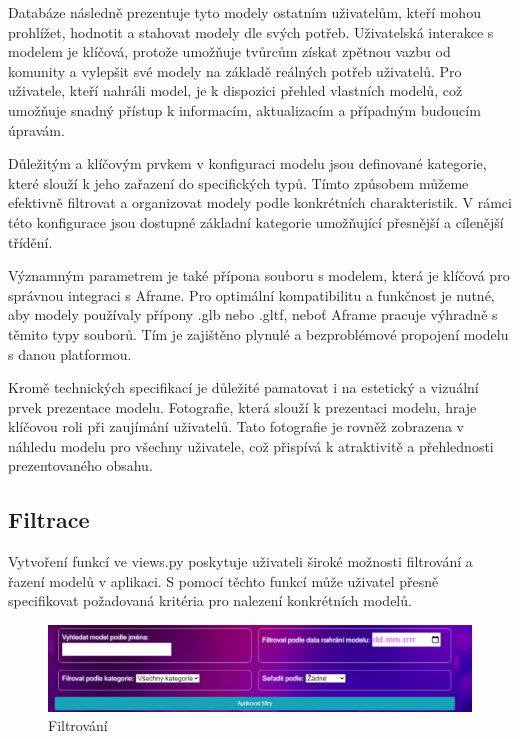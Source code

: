 \documentclass[12pt, a4paper,
oneside,      %
openright
]{report}
\begin{document}
	Databáze následně prezentuje tyto modely ostatním uživatelům, kteří mohou prohlížet, hodnotit a stahovat modely dle svých potřeb. Uživatelská interakce s modelem je klíčová, protože umožňuje tvůrcům získat zpětnou vazbu od komunity a vylepšit své modely na základě reálných potřeb uživatelů. Pro uživatele, kteří nahráli model, je k dispozici přehled vlastních modelů, což umožňuje snadný přístup k informacím, aktualizacím a případným budoucím úpravám. 
	
Důležitým a klíčovým prvkem v konfiguraci modelu jsou definované kategorie, které slouží k jeho zařazení do specifických typů. Tímto způsobem můžeme efektivně filtrovat a organizovat modely podle konkrétních charakteristik. V rámci této konfigurace jsou dostupné základní kategorie umožňující přesnější a cílenější třídění.


Významným parametrem je také přípona souboru s modelem, která je klíčová pro správnou integraci s Aframe. Pro optimální kompatibilitu a funkčnost je nutné, aby modely používaly přípony .glb nebo .gltf, neboť Aframe pracuje výhradně s těmito typy souborů. Tím je zajištěno plynulé a bezproblémové propojení modelu s danou platformou.

Kromě technických specifikací je důležité pamatovat i na estetický a vizuální prvek prezentace modelu. Fotografie, která slouží k prezentaci modelu, hraje klíčovou roli při zaujímání uživatelů. Tato fotografie je rovněž zobrazena v náhledu modelu pro všechny uživatele, což přispívá k atraktivitě a přehlednosti prezentovaného obsahu.

	
	\newpage	
	\subsection[Filtrace]{Filtrace}
	
	Vytvoření funkcí ve views.py poskytuje uživateli široké možnosti filtrování a řazení modelů v aplikaci. S pomocí těchto funkcí může uživatel přesně specifikovat požadovaná kritéria pro nalezení konkrétních modelů.
	\begin{figure}[h]
			\centering
			\includegraphics[width=1\linewidth]{image/Filtrace.png} 
			\caption{Filtrování}
	\end{figure}
\end{document}
